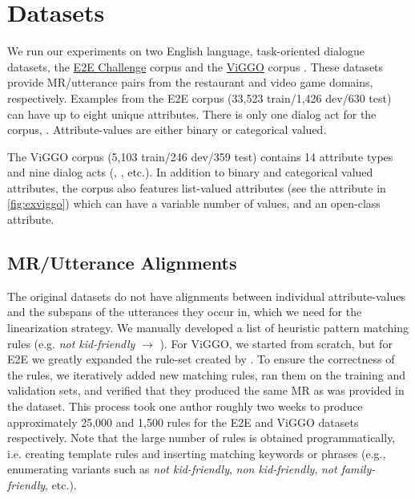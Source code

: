 \section{Datasets}

We run our experiments on two English language, task-oriented dialogue
datasets, the \href{http://www.macs.hw.ac.uk/InteractionLab/E2E/}{E2E
Challenge} corpus \cite{novikova2017} and the
\href{https://nlds.soe.ucsc.edu/viggo}{ViGGO} corpus \cite{juraska2019}. These
datasets provide MR/utterance pairs from the restaurant and video game
domains, respectively. Examples from the E2E corpus (33,523 train/1,426
dev/630 test) can have up to eight unique attributes.  There is only one
dialog act for the corpus, .  Attribute-values are either binary or
categorical valued.

The ViGGO corpus (5,103 train/246 dev/359 test) contains 14 attribute types
and nine dialog acts (, , etc.).  In
addition to binary and categorical valued attributes, the corpus also features
list-valued attributes (see the  attribute in
\autoref{fig:exviggo}) which can have a variable number of values, and an
open-class  attribute. 

\subsection{MR/Utterance Alignments}
\label{sec:align}

The original datasets do not have alignments between individual
attribute-values and the subspans of the utterances they occur in, which we
need for the  linearization strategy.  We manually developed a
list of heuristic pattern matching rules (e.g. \textit{not kid-friendly}
$\rightarrow$ ).  For ViGGO, we started from
scratch, but for E2E we greatly expanded the rule-set created by
\citet{dusek2019}.  To ensure the correctness of the rules, we
iteratively added new matching rules, ran them on the training and validation
sets, and verified that they produced the same MR as was provided in the
dataset. This process took one author roughly two weeks to produce
approximately 25,000 and 1,500 rules for the E2E and ViGGO datasets
respectively. Note that the large number of rules is obtained
programmatically, i.e. creating template rules and inserting matching keywords
or phrases (e.g., enumerating variants such as \textit{not kid-friendly},
\textit{non kid-friendly}, \textit{not family-friendly}, etc.).

